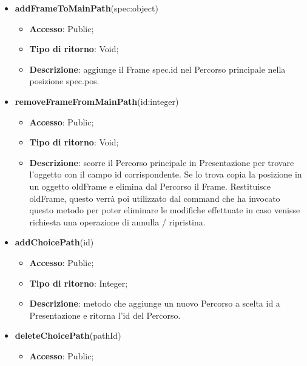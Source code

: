 {\begin{itemize}
			\begin{itemize}
				\item \textbf{Accesso}: Public;
				\item \textbf{Tipo di ritorno}: Void;
				\item \textbf{Descrizione}: scorre il campo dati che contiene gli oggetti di tipo SlideShowElements in Presentazione per trovare l’oggetto con il campo spec.id corrispondente. Se lo trova diminuisce il valore di zIndex.
			\end{itemize}
			\item \textbf{addFrameToMainPath}(spec:object)
			\begin{itemize}
				\item \textbf{Accesso}: Public;
				\item \textbf{Tipo di ritorno}: Void;
				\item \textbf{Descrizione}: aggiunge il Frame spec.id nel Percorso principale nella posizione spec.pos.
			\end{itemize}
			\item \textbf{removeFrameFromMainPath}(id:integer)
			\begin{itemize}
				\item \textbf{Accesso}: Public;
				\item \textbf{Tipo di ritorno}: Void;
				\item \textbf{Descrizione}: scorre il Percorso principale in Presentazione per trovare l’oggetto con il campo id corrispondente. Se lo trova copia la posizione in un oggetto oldFrame e elimina dal Percorso\ped{g} il Frame. Restituisce oldFrame, questo verrà poi utilizzato dal command che ha invocato questo metodo per poter eliminare le modifiche effettuate in caso venisse richiesta una operazione di annulla / ripristina.
			\end{itemize}
			\item \textbf{addChoicePath}(id)
			\begin{itemize}
				\item \textbf{Accesso}: Public;
				\item \textbf{Tipo di ritorno}: Integer;
				\item \textbf{Descrizione}: metodo che aggiunge un nuovo Percorso a scelta id a Presentazione e ritorna l'id del Percorso.
			\end{itemize}
			\item \textbf{deleteChoicePath}(pathId)
			\begin{itemize}
				\item \textbf{Accesso}: Public;

\end{itemize}
\end{itemize}}
